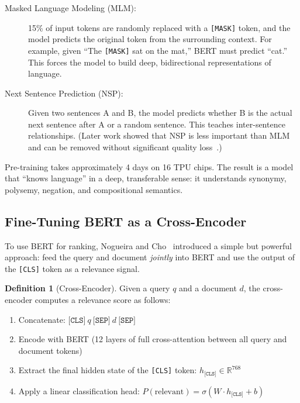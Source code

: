 \documentclass[11pt,a4paper]{article}
\theoremstyle{definition}
\newtheorem{definition}{Definition}[section]
\theoremstyle{plain}
\begin{document}
\begin{description}
    \item[Masked Language Modeling (MLM):] 15\% of input tokens are randomly replaced with a \texttt{[MASK]} token, and the model predicts the original token from the surrounding context. For example, given ``The \texttt{[MASK]} sat on the mat,'' BERT must predict ``cat.'' This forces the model to build deep, bidirectional representations of language.
    
    \item[Next Sentence Prediction (NSP):] Given two sentences A and B, the model predicts whether B is the actual next sentence after A or a random sentence. This teaches inter-sentence relationships. (Later work showed that NSP is less important than MLM and can be removed without significant quality loss~\cite{liu2019roberta}.)
\end{description}

Pre-training takes approximately 4 days on 16 TPU chips. The result is a model that ``knows language'' in a deep, transferable sense: it understands synonymy, polysemy, negation, and compositional semantics.

\subsection{Fine-Tuning BERT as a Cross-Encoder}

To use BERT for ranking, Nogueira and Cho~\cite{nogueira2019passage} introduced a simple but powerful approach: feed the query and document \emph{jointly} into BERT and use the output of the \texttt{[CLS]} token as a relevance signal.

\begin{definition}[Cross-Encoder]
Given a query $q$ and a document $d$, the cross-encoder computes a relevance score as follows:
\begin{enumerate}
    \item Concatenate: $\texttt{[CLS]}\ q\ \texttt{[SEP]}\ d\ \texttt{[SEP]}$
    \item Encode with BERT (12 layers of full cross-attention between all query and document tokens)
    \item Extract the final hidden state of the \texttt{[CLS]} token: $h_\texttt{[CLS]} \in \mathbb{R}^{768}$
    \item Apply a linear classification head: $P(\text{relevant}) = \sigma(W \cdot h_\texttt{[CLS]} + b)$
\end{enumerate}
\end{definition}
\end{document}

